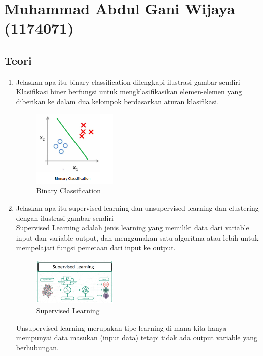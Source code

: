 \section{Muhammad Abdul Gani Wijaya (1174071)}
\subsection{Teori}
\begin{enumerate}

\item Jelaskan apa itu binary classiﬁcation dilengkapi ilustrasi gambar sendiri\\
Klasifikasi biner berfungsi untuk mengklasifikasikan elemen-elemen yang diberikan ke dalam dua kelompok berdasarkan aturan klasifikasi.

\begin{figure}
		\includegraphics[width=4cm]{figures/1174071/2/binclass.png}
		\centering
		\caption{Binary Classification}
	\end{figure}

\item Jelaskan apa itu supervised learning dan unsupervised learning dan clustering dengan ilustrasi gambar sendiri\\

Supervised Learning adalah jenis learning yang memiliki data dari variable input dan variable output, dan menggunakan satu algoritma atau lebih untuk mempelajari fungsi pemetaan dari input ke output.

\begin{figure}
		\includegraphics[width=4cm]{figures/1174071/2/sup.png}
		\centering
		\caption{Supervised Learning}
	\end{figure}
	
Unsupervised learning merupakan tipe learning di mana kita hanya mempunyai data masukan (input data) tetapi tidak ada output variable yang berhubungan.


\end{enumerate}

